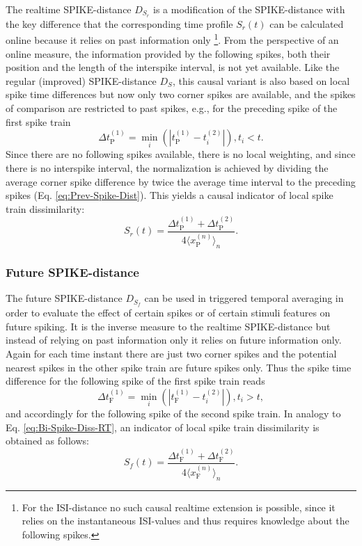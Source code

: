 \documentclass[10pt,twocolumn]{elsart5p}
\begin{document}
The realtime SPIKE-distance $D_{S_r}$ is a modification of the SPIKE-distance with the key difference that the corresponding time profile $S_r(t)$ can be calculated online because it relies on past information only \footnote{For the ISI-distance no such causal realtime extension is possible, since it relies on the instantaneous ISI-values and thus requires knowledge about the following spikes.}. From the perspective of an online measure, the information provided by the following spikes, both their position and the length of the interspike interval, is not yet available. Like the regular (improved) SPIKE-distance $D_S$, this causal variant is also based on local spike time differences but now only two corner spikes are available, and the spikes of comparison are restricted to past spikes, e.g., for the preceding spike of the first spike train
%
\begin{equation} \label{eq:Delta-Corner-Spike-Realtime}
     \Delta t_{\mathrm {P}}^{(1)} = \min_i (| t_{\mathrm {P}}^{(1)} - t_i^{(2)} |), t_i < t.
\end{equation}
%
Since there are no following spikes available, there is no local weighting, and since there is no interspike interval, the normalization is achieved by dividing the average corner spike difference by twice the average time interval to the preceding spikes (Eq. \ref{eq:Prev-Spike-Dist}). This yields a causal indicator of local spike train dissimilarity:
%
\begin{equation} \label{eq:Bi-Spike-Diss-RT}
    S_r (t) = \frac{ \Delta t_{\mathrm {P}}^{(1)} + \Delta t_{\mathrm {P}}^{(2)}} {4 \langle x_{\mathrm {P}}^{(n)} \rangle_n}.
\end{equation}


\subsubsection{\label{sss:Future-Spike-Distance} Future SPIKE-distance}

The future SPIKE-distance $D_{S_f}$ can be used in triggered temporal averaging in order to evaluate the effect of certain spikes or of certain stimuli features on future spiking. It is the inverse measure to the realtime SPIKE-distance but instead of relying on past information only it relies on future information only. Again for each time instant there are just two corner spikes and the potential nearest spikes in the other spike train are future spikes only. Thus the spike time difference for the following spike of the first spike train reads
%
\begin{equation} \label{eq:Delta-Corner-Spike-Future}
     \Delta t_{\mathrm {F}}^{(1)} = \min_i (| t_{\mathrm {F}}^{(1)} - t_i^{(2)} |), t_i > t,
\end{equation}
%
and accordingly for the following spike of the second spike train. In analogy to Eq. \ref{eq:Bi-Spike-Diss-RT}, an indicator of local spike train dissimilarity is obtained as follows:
%
\begin{equation} \label{eq:Bi-Spike-Diss-FT}
    S_f (t) = \frac{ \Delta t_{\mathrm {F}}^{(1)} + \Delta t_{\mathrm {F}}^{(2)}} {4 \langle x_{\mathrm {F}}^{(n)} \rangle_n}.
\end{equation}	
\end{document}
